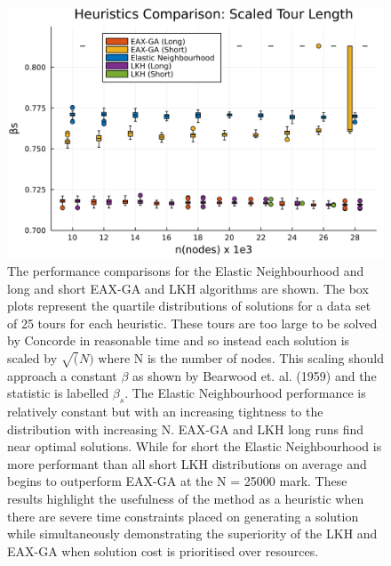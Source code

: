 \begin{figure}[h]
	\centering
	\includegraphics[width=\textwidth]{images/elastic_neighbourhood/fig_heuristicscomparison}
	\def\c{The performance comparisons for the Elastic Neighbourhood and long and short EAX-GA and LKH algorithms are shown. }
	\caption[\c]{\label{fig:heuristicsperformance}\c The box plots represent the quartile distributions of solutions for a data set of 25 tours for each heuristic. These tours are too large to be solved by Concorde in reasonable time and so instead each solution is scaled by $\sqrt(N)$ where N is the number of nodes. This scaling should approach a constant $\beta$ as shown by Bearwood et. al. (1959) \cite{Beardwood1959-wb} and the statistic is labelled $\beta_s$. The Elastic Neighbourhood performance is relatively constant but with an increasing tightness to the distribution with increasing N. EAX-GA and LKH long runs find near optimal solutions. While for short the Elastic Neighbourhood is more performant than all short LKH distributions on average and begins to outperform EAX-GA at the N = 25000 mark. These results highlight the usefulness of the method as a heuristic when there are severe time constraints placed on generating a solution while simultaneously demonstrating the superiority of the LKH and EAX-GA when solution cost is prioritised over resources.}
\end{figure}
\FloatBarrier
